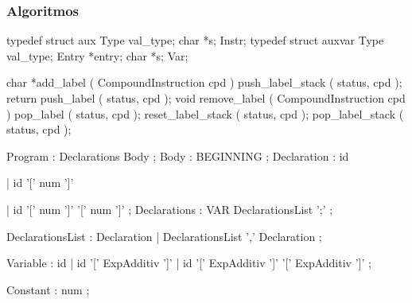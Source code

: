 \subsubsection{Algoritmos}
\label{subsec:subsubsection:algoritmos:desenho}













  typedef struct aux {
        Type val_type;
        char *s;
    } Instr;
    typedef struct auxvar {
        Type val_type;
        Entry *entry;
        char *s;
    } Var;


  char   *add_label ( CompoundInstruction cpd )
    {
        push_label_stack ( status, cpd );
        return push_label ( status, cpd );
    }
    void remove_label ( CompoundInstruction cpd )
    {
        pop_label ( status, cpd );
        reset_label_stack ( status, cpd );
        pop_label_stack ( status, cpd );
    }




Program : Declarations Body     
;
Body : BEGINNING 
;
Declaration : id              

| id '[' num ']'              

| id '[' num ']' '[' num ']'  
;
Declarations : VAR DeclarationsList ';'       
;


DeclarationsList : Declaration             
| DeclarationsList ',' Declaration         
;

Variable : id                 
| id '[' ExpAdditiv ']'       
| id '[' ExpAdditiv ']' '[' ExpAdditiv ']' 
;

Constant : num  
         ;


